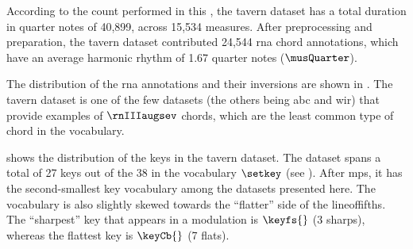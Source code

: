 
According to the count performed in this \thesisdiss{}, the
\gls{tavern} dataset has a total duration in quarter notes
of 40,899, across 15,534 measures. After preprocessing and
preparation, the \gls{tavern} dataset contributed 24,544
\gls{rna} chord annotations, which have an average harmonic
rhythm of 1.67 quarter notes ($\musQuarter$).

The distribution of the \gls{rna} annotations and their
inversions are shown in . The
\gls{tavern} dataset is one of the few datasets (the others
being \gls{abc} and \gls{wir}) that provide examples of
$\rnIIIaugsev$ chords, which are the least common type of
chord in the vocabulary.



 shows the distribution of the
keys in the \gls{tavern} dataset. The dataset spans a total
of 27 keys out of the 38 in the vocabulary $\setkey$ (see
). After \gls{mps}, it
has the second-smallest key vocabulary among the datasets
presented here. The vocabulary is also slightly skewed
towards the ``flatter'' side of the \gls{lineoffifths}. The
``sharpest'' key that appears in a modulation is $\keyfs{}$
(3 sharps), whereas the flattest key is $\keyCb{}$ (7
flats).
